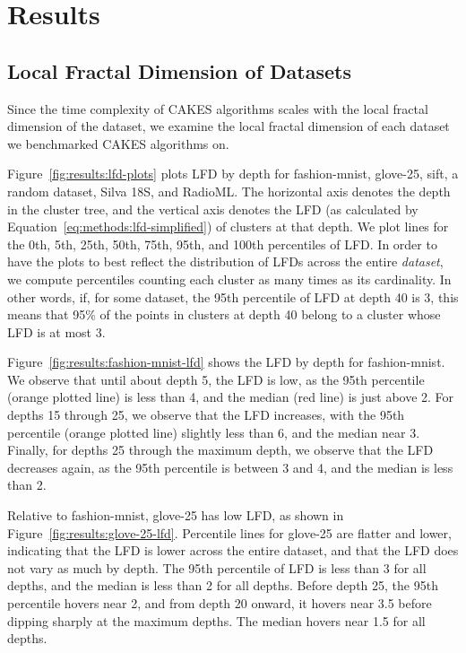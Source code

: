 \section{Results}
\label{sec:results}


\subsection{Local Fractal Dimension of Datasets}
\label{subsec:lfd-results}

Since the time complexity of CAKES algorithms scales with the local fractal dimension of the dataset, we examine the local fractal dimension of each dataset we benchmarked CAKES algorithms on.

Figure~\ref{fig:results:lfd-plots} plots LFD by depth for fashion-mnist, glove-25, sift, a random dataset, Silva 18S, and RadioML.
The horizontal axis denotes the depth in the cluster tree, and the vertical axis denotes the LFD (as calculated by Equation~\ref{eq:methods:lfd-simplified}) of clusters at that depth.
We plot lines for the 0th, 5th, 25th, 50th, 75th, 95th, and 100th percentiles of LFD.
In order to have the plots to best reflect the distribution of LFDs across the entire \emph{dataset}, we compute percentiles counting each cluster as many times as its cardinality.
In other words, if, for some dataset, the 95th percentile of LFD at depth 40 is 3, this means that 95\% of the points in clusters at depth 40 belong to a cluster whose LFD is at most 3.

Figure~\ref{fig:results:fashion-mnist-lfd} shows the LFD by depth for fashion-mnist.
We observe that until about depth 5, the LFD is low, as the 95th percentile (orange plotted line) is less than 4, and the median (red line) is just above 2.
For depths 15 through 25, we observe that the LFD increases, with the 95th percentile (orange plotted line) slightly less than 6, and the median near 3.
Finally, for depths 25 through the maximum depth, we observe that the LFD decreases again, as the 95th percentile is between 3 and 4, and the median is less than 2.

Relative to fashion-mnist, glove-25 has low LFD, as shown in Figure~\ref{fig:results:glove-25-lfd}.
Percentile lines for glove-25 are flatter and lower, indicating that the LFD is lower across the entire dataset, and that the LFD does not vary as much by depth.
The 95th percentile of LFD is less than 3 for all depths, and the median is less than 2 for all depths. 
Before depth 25, the 95th percentile hovers near 2, and from depth 20 onward, it hovers near 3.5 before dipping sharply at the maximum depths.
The median hovers near 1.5 for all depths.

